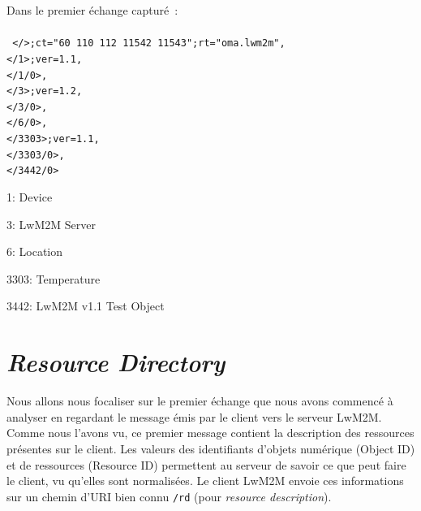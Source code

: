 {Dans le premier échange capturé~:\\
\\
\texttt{
</>;ct="60 110 112 11542 11543";rt="oma.lwm2m",\\
</1>;ver=1.1,\\
</1/0>,\\
</3>;ver=1.2,\\
</3/0>,\\
</6/0>,\\
</3303>;ver=1.1,\\
</3303/0>,\\
</3442/0>\\
}
}
{
\begin{description}
    \item 1: Device 
    \item 3: LwM2M Server
    \item 6: Location
    \item 3303: Temperature
    \item 3442: LwM2M v1.1 Test Object
\end{description}
}

\section{\textit{Resource Directory}}

Nous allons nous focaliser sur le premier échange que nous avons commencé à analyser en regardant le message émis par le client vers le serveur LwM2M. Comme nous l'avons vu, ce premier message contient la description des ressources présentes sur le client. Les valeurs des identifiants d'objets numérique (Object ID) et de ressources (Resource ID) permettent au serveur de savoir ce que peut faire le client, vu qu'elles sont normalisées. Le client LwM2M envoie ces informations sur un chemin d'URI bien connu \texttt{/rd} (pour \textit{resource description}).

